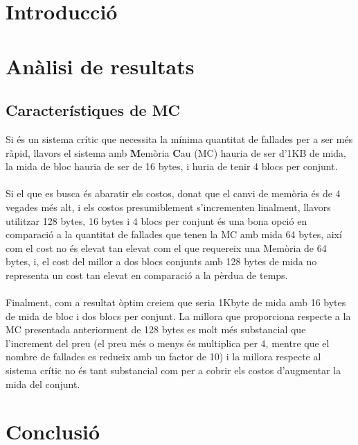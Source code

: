 \documentclass{article}
\begin{document}
\section{Introducció}
\section{Anàlisi de resultats}
\subsection{Característiques de MC}
Si és un sistema crític que necessita la mínima quantitat de fallades per a ser més
ràpid, llavors el sistema amb \textbf{M}emòria \textbf{C}au (MC) hauria de ser d'1KB
de mida, la mida de bloc hauria de ser de 16 bytes, i huria de tenir 4 blocs per conjunt.\\
\\
Si el que es busca és abaratir els costos, donat que el canvi de memòria és de 4 vegades més
alt, i els costos presumiblement s'incrementen linalment, llavors utilitzar 128 bytes, 16 bytes i
4 blocs per conjunt és una bona opció en comparació a la quantitat de fallades que tenen la MC amb
mida 64 bytes, així com el cost no és elevat tan elevat com el que requereix una Memòria de 64 bytes,
i, el cost del millor a dos blocs conjunts amb 128 bytes de mida no representa un cost tan elevat
en comparació a la pèrdua de temps.\\
\\
Finalment, com a resultat òptim creiem que seria 1Kbyte de mida amb 16 bytes de mida de bloc i
dos blocs per conjunt. La millora que proporciona respecte a la MC presentada anteriorment de 128 bytes
es molt més substancial que l'increment del preu (el preu més o menys és multiplica per 4, mentre que
el nombre de fallades es redueix amb un factor de 10) i la millora respecte al sistema crític no
és tant substancial com per a cobrir els costos d'augmentar la mida del conjunt.
\section{Conclusió}
\end{document}
